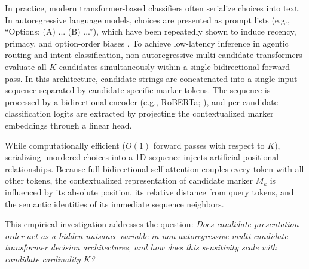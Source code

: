 \documentclass[11pt,a4paper]{article}
\begin{document}
In practice, modern transformer-based classifiers often serialize choices into text. In autoregressive language models, choices are presented as prompt lists (e.g., ``Options: (A) ... (B) ...''), which have been repeatedly shown to induce recency, primacy, and option-order biases \citep{liu2024lost, pezeshkpour2024large, zheng2024large}. To achieve low-latency inference in agentic routing and intent classification, non-autoregressive multi-candidate transformers \citep{laya2024} evaluate all $K$ candidates simultaneously within a single bidirectional forward pass. In this architecture, candidate strings are concatenated into a single input sequence separated by candidate-specific marker tokens. The sequence is processed by a bidirectional encoder (e.g., RoBERTa; \citealp{liu2019roberta}), and per-candidate classification logits are extracted by projecting the contextualized marker embeddings through a linear head.

While computationally efficient ($O(1)$ forward passes with respect to $K$), serializing unordered choices into a 1D sequence injects artificial positional relationships. Because full bidirectional self-attention couples every token with all other tokens, the contextualized representation of candidate marker $M_k$ is influenced by its absolute position, its relative distance from query tokens, and the semantic identities of its immediate sequence neighbors.

This empirical investigation addresses the question: \textit{Does candidate presentation order act as a hidden nuisance variable in non-autoregressive multi-candidate transformer decision architectures, and how does this sensitivity scale with candidate cardinality $K$?}
\end{document}
